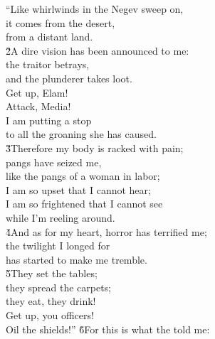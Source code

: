 \begin{poetry}
\poeml ``Like whirlwinds in the Negev sweep on, \\
\poemll    it comes from the desert, \\
\poemlll       from a distant land. \\
\poeml \v{2}A dire vision has been announced to me: \\
\poemll    the traitor betrays, \\
\poemlll       and the plunderer takes loot. \\
\poeml Get up, Elam! \\
\poemll    Attack, Media! \\
\poeml I am putting a stop \\
\poemll    to all the groaning she has caused. \\
\poeml \v{3}Therefore my body is racked with pain; \\
\poemll    pangs have seized me, \\
\poemlll       like the pangs of a woman in labor; \\
\poeml I am so upset that I cannot hear; \\
\poemll    I am so frightened that I cannot see \\
\poemll    while I'm reeling around. \\
\poeml \v{4}And as for my heart, horror has terrified me; \\
\poemll    the twilight I longed for \\
\poemlll       has started to make me tremble. \\
\poeml \v{5}They set the tables; \\
\poemll    they spread the carpets; \\
\poemlll       they eat, they drink! \\
\poeml Get up, you officers! \\
\poemll    Oil the shields!''
\poeml \v{6}For this is what the  told me: \\

\end{poetry}
